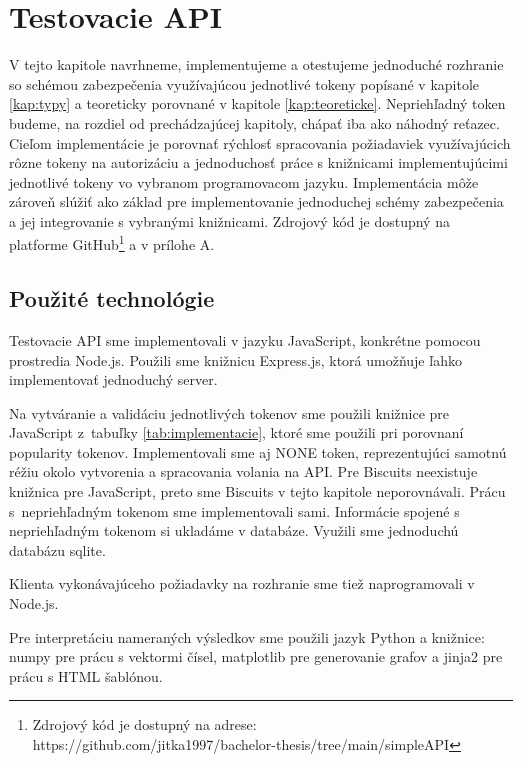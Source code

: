 \chapter{Testovacie API}

\label{kap:prakticke} %

V tejto kapitole navrhneme, implementujeme a otestujeme jednoduché rozhranie so schémou zabezpečenia využívajúcou jednotlivé tokeny popísané v kapitole \ref{kap:typy} a teoreticky porovnané v kapitole \ref{kap:teoreticke}. Nepriehľadný token budeme, na rozdiel od prechádzajúcej kapitoly, chápať iba ako náhodný reťazec. Cieľom implementácie je porovnať rýchlosť spracovania požiadaviek využívajúcich rôzne tokeny na autorizáciu a jednoduchosť práce s knižnicami implementujúcimi jednotlivé tokeny vo vybranom programovacom jazyku. Implementácia môže zároveň slúžiť ako základ pre implementovanie jednoduchej schémy zabezpečenia a jej integrovanie s vybranými knižnicami. Zdrojový kód je dostupný na platforme GitHub\footnote{Zdrojový kód je dostupný na adrese:\\ https://github.com/jitka1997/bachelor-thesis/tree/main/simpleAPI} a v prílohe A.

\section{Použité technológie}

Testovacie API sme implementovali v jazyku JavaScript, konkrétne pomocou prostredia Node.js. Použili sme knižnicu Express.js, ktorá umožňuje ľahko implementovať jednoduchý server.

Na vytváranie a validáciu jednotlivých tokenov sme použili knižnice pre JavaScript z~tabuľky \ref{tab:implementacie}, ktoré sme použili pri porovnaní popularity tokenov. Implementovali sme aj NONE token, reprezentujúci samotnú réžiu okolo vytvorenia a spracovania volania na API. Pre Biscuits neexistuje knižnica pre JavaScript, preto sme Biscuits v tejto kapitole neporovnávali. Prácu s~nepriehľadným tokenom sme implementovali sami. Informácie spojené s nepriehľadným tokenom si ukladáme v databáze. Využili sme jednoduchú databázu sqlite.

Klienta vykonávajúceho požiadavky na rozhranie sme tiež naprogramovali v Node.js.

Pre interpretáciu nameraných výsledkov sme použili jazyk Python a knižnice: numpy pre prácu s vektormi čísel, matplotlib pre generovanie grafov a jinja2 pre prácu s HTML šablónou.

